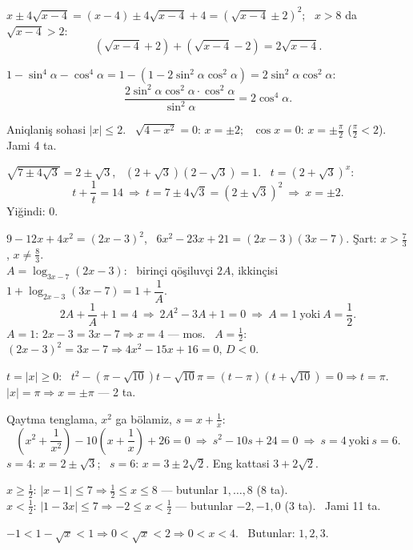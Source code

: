 $x\pm4\sqrt{x-4}=(x-4)\pm4\sqrt{x-4}+4=\left(\sqrt{x-4}\pm2\right)^2$; \ $x>8$ da $\sqrt{x-4}>2$:
\[\left(\sqrt{x-4}+2\right)+\left(\sqrt{x-4}-2\right)=2\sqrt{x-4}.\]

$1-\sin^4\alpha-\cos^4\alpha=1-\left(1-2\sin^2\alpha\cos^2\alpha\right)=2\sin^2\alpha\cos^2\alpha$:
\[\frac{2\sin^2\alpha\cos^2\alpha\cdot\cos^2\alpha}{\sin^2\alpha}=2\cos^4\alpha.\]

Aniqlaniş sohasi $|x|\le2$. \ $\sqrt{4-x^2}=0$: $x=\pm2$; \ $\cos x=0$: $x=\pm\frac\pi2$ ($\frac\pi2<2$).\\
Jami 4 ta.

$\sqrt{7\pm4\sqrt3}=2\pm\sqrt3$, \ $(2+\sqrt3)(2-\sqrt3)=1$. \ $t=(2+\sqrt3)^x$:
\[t+\frac1t=14\ \Rightarrow\ t=7\pm4\sqrt3=(2\pm\sqrt3)^2\ \Rightarrow\ x=\pm2.\]
Yiğindi: $0$.

$9-12x+4x^2=(2x-3)^2$, \ $6x^2-23x+21=(2x-3)(3x-7)$. Şart: $x>\frac73$, $x\ne\frac83$.\\
$A=\log_{3x-7}(2x-3)$: \ birinçi qöşiluvçi $2A$, ikkinçisi $1+\log_{2x-3}(3x-7)=1+\dfrac1A$.
\[2A+\frac1A+1=4\ \Rightarrow\ 2A^2-3A+1=0\ \Rightarrow\ A=1\ \text{yoki}\ A=\frac12.\]
$A=1$: $2x-3=3x-7\Rightarrow x=4$ — mos. \ $A=\frac12$: $(2x-3)^2=3x-7\Rightarrow4x^2-15x+16=0$, $D<0$.

$t=|x|\ge0$: \ $t^2-(\pi-\sqrt{10})t-\sqrt{10}\pi=(t-\pi)(t+\sqrt{10})=0\Rightarrow t=\pi$.\\
$|x|=\pi\Rightarrow x=\pm\pi$ — 2 ta.

Qaytma tenglama, $x^2$ ga bölamiz, $s=x+\frac1x$:
\[\left(x^2+\frac1{x^2}\right)-10\left(x+\frac1x\right)+26=0\ \Rightarrow\ s^2-10s+24=0\ \Rightarrow\ s=4\ \text{yoki}\ s=6.\]
$s=4$: $x=2\pm\sqrt3$; \ $s=6$: $x=3\pm2\sqrt2$. Eng kattasi $3+2\sqrt2$.

$x\ge\frac12$: $\bigl|x-1\bigr|\le7\Rightarrow\frac12\le x\le8$ — butunlar $1,\dots,8$ (8 ta).\\
$x<\frac12$: $|1-3x|\le7\Rightarrow-2\le x<\frac12$ — butunlar $-2,-1,0$ (3 ta). \ Jami 11 ta.

$-1<1-\sqrt x<1\Rightarrow 0<\sqrt x<2\Rightarrow 0<x<4$. \ Butunlar: $1,2,3$.

